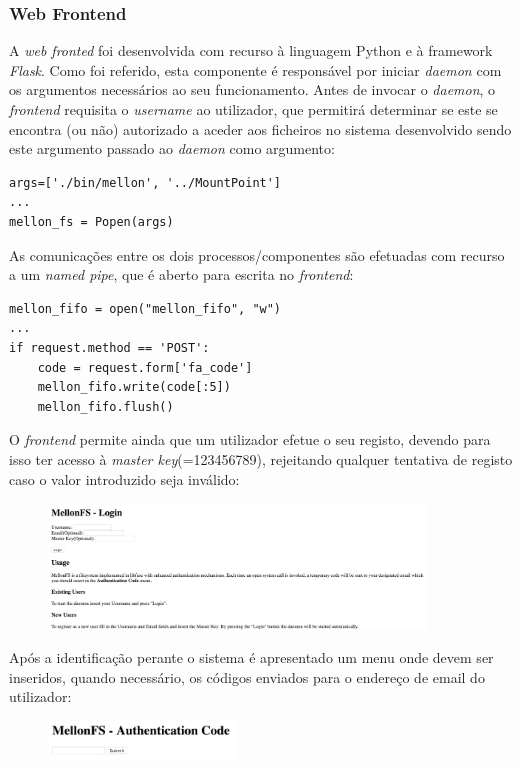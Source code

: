 \documentclass{article}
\begin{document}
\subsubsection{Web Frontend}
A \textit{web fronted} foi desenvolvida com recurso à linguagem Python e à framework \textit{Flask}.
Como foi referido, esta componente é responsável por iniciar \textit{daemon} com os argumentos necessários ao seu funcionamento.
Antes de invocar o \textit{daemon}, o \textit{frontend} requisita o \textit{username} ao utilizador, que permitirá determinar se este se 
encontra (ou não) autorizado a aceder aos ficheiros no sistema desenvolvido sendo este argumento passado ao \textit{daemon} como argumento:
\begin{Verbatim}
args=['./bin/mellon', '../MountPoint']
...
mellon_fs = Popen(args)
\end{Verbatim}
As comunicações entre os dois processos/componentes são efetuadas com recurso a um \textit{named pipe}, que é aberto para escrita no 
\textit{frontend}:
\begin{Verbatim}
mellon_fifo = open("mellon_fifo", "w")
...
if request.method == 'POST':
    code = request.form['fa_code']
    mellon_fifo.write(code[:5])
    mellon_fifo.flush()
\end{Verbatim}
O \textit{frontend} permite ainda que um utilizador efetue o seu registo, devendo para isso ter acesso à \textit{master key}(=123456789),
rejeitando qualquer tentativa de registo caso o valor introduzido seja inválido:
\begin{figure}[H]
    \centering
    \includegraphics[width=10cm]{Pictures/Main.png}
\end{figure}
Após a identificação perante o sistema é apresentado um menu onde devem ser inseridos, quando necessário, os códigos enviados para o endereço
de email do utilizador:
\begin{figure}[H]
    \centering
    \includegraphics[width=5cm]{Pictures/Auth.png}
\end{figure}
\end{document}
